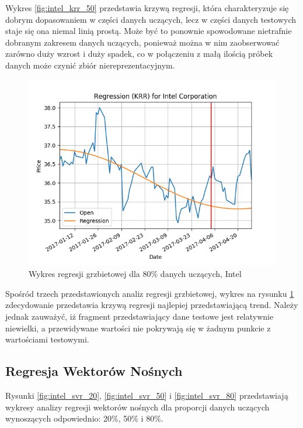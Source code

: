 Wykres \ref{fig:intel_krr_50} przedstawia krzywą regresji, która charakteryzuje się dobrym dopasowaniem w części danych uczących, lecz w części danych testowych staje się ona niemal linią prostą.
Może być to ponownie spowodowane nietrafnie dobranym zakresem danych uczących, ponieważ można w nim zaobserwować zarówno duży wzrost i duży spadek, co w połączeniu z małą ilością próbek danych może czynić zbiór niereprezentacyjnym.\\

\begin{figure}[ht]
\centering
\includegraphics[scale=0.5]{pictures/plots/intel_krr_80.png}
\caption{Wykres regresji grzbietowej dla 80\% danych uczących, Intel}
\label{fig:intel_krr_80}
\end{figure}

Spośród trzech przedstawionych analiz regresji grzbietowej, wykres na rysunku \ref{fig:intel_krr_80} zdecydowanie przedstawia krzywą regresji najlepiej przedstawiającą trend.
Należy jednak zauważyć, iż fragment przedstawiający dane testowe jest relatywnie niewielki, a przewidywane wartości nie pokrywają się w żadnym punkcie z wartościami testowymi.\\

\subsection{Regresja Wektorów Nośnych}

Rysunki \ref{fig:intel_svr_20}, \ref{fig:intel_svr_50} i \ref{fig:intel_svr_80} przedstawiają wykresy analizy regresji wektorów nośnych dla proporcji danych uczących wynoszących odpowiednio: 20\%, 50\% i 80\%.\\

